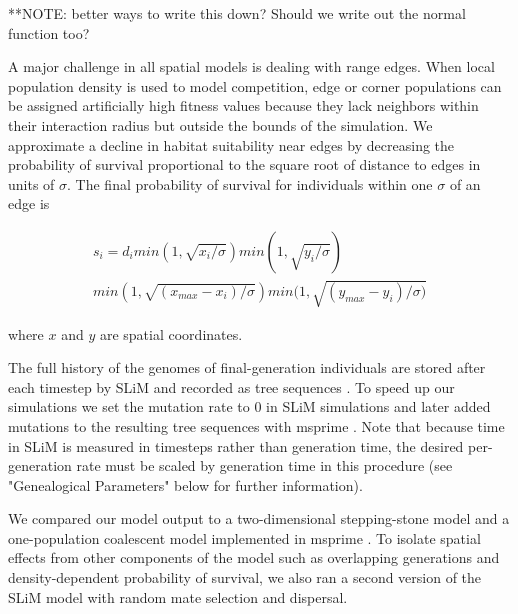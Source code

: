 \documentclass[9pt,twocolumn,twoside,lineno]{gsajnl}
\begin{document}
**NOTE: better ways to write this down? Should we write out the normal function too?

A major challenge in all spatial models is dealing with range edges. When local population density is used to model competition, edge or corner populations can be assigned artificially high fitness values because they lack neighbors within their interaction radius but outside the bounds of the simulation. We approximate a decline in habitat suitability near edges by decreasing the probability of survival proportional to the square root of distance to edges in units of $\sigma$. The final probability of survival for individuals within one $\sigma$ of an edge is 

\begin{multline}
    s_{i}=d_{i} min(1,\sqrt{x_{i}/\sigma})
    min(1,\sqrt{y_{i}/\sigma})\\
    min(1,\sqrt{(x_{max}-x_{i})/\sigma})
    min(1,\sqrt{(y_{max}-y_{i})/\sigma)}
\end{multline}

where $x$ and $y$ are spatial coordinates. 

The full history of the genomes of final-generation individuals are stored after each timestep by SLiM and recorded as tree sequences \citep{Kelleher2018}. To speed up our simulations we set the mutation rate to 0 in SLiM simulations and later added mutations to the resulting tree sequences with msprime \citep{Kelleher2016}. Note that because time in SLiM is measured in timesteps rather than generation time, the desired per-generation rate must be scaled by generation time in this procedure (see "Genealogical Parameters" below for further information). 

We compared our model output to a two-dimensional stepping-stone model and a one-population coalescent model implemented in msprime \citep{Kelleher2016}. To isolate spatial effects from other components of the model such as overlapping generations and density-dependent probability of survival, we also ran a second version of the SLiM model with random mate selection and dispersal. 
\end{document}
